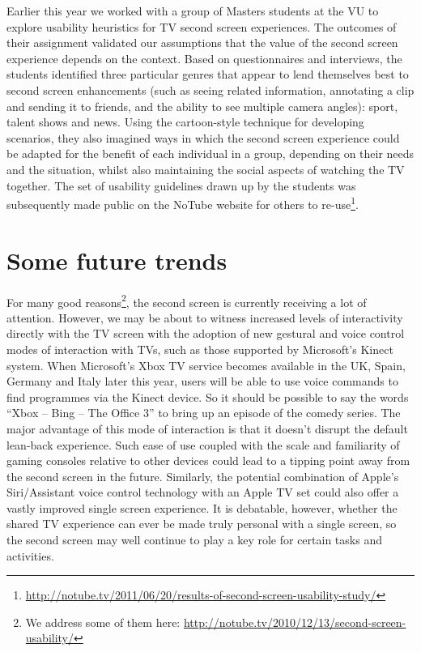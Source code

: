 \documentclass{notube}
\begin{document}
Earlier this year we worked with a group of Masters students at the VU to explore usability heuristics for TV second screen experiences. The outcomes of their assignment validated our assumptions that the value of the second screen experience depends on the context. Based on questionnaires and interviews, the students identified three particular genres that appear to lend themselves best to second screen enhancements (such as seeing related information, annotating a clip and sending it to friends, and the ability to see multiple camera angles): sport, talent shows and news. Using the cartoon-style technique for developing scenarios, they also imagined ways in which the second screen experience could be adapted for the benefit of each individual in a group, depending on their needs and the situation, whilst also maintaining the social aspects of watching the TV together. The set of usability guidelines drawn up by the students was subsequently made public on the NoTube website for others to re-use\footnote{\url{http://notube.tv/2011/06/20/results-of-second-screen-usability-study/}}.

\section{Some future trends}

For many good reasons\footnote{We address some of them here: \url{http://notube.tv/2010/12/13/second-screen-usability/}}, the second screen is currently receiving a lot of attention. However, we may be about to witness increased levels of interactivity directly with the TV screen with the adoption of new gestural and voice control modes of interaction with TVs, such as those supported by Microsoft’s Kinect system. When Microsoft’s Xbox TV service becomes available in the UK, Spain, Germany and Italy later this year, users will be able to use voice commands to find programmes via the Kinect device. So it should be possible to say the words ``Xbox – Bing – The Office 3” to bring up an episode of the comedy series. The major advantage of this mode of interaction is that it doesn’t disrupt the default lean-back experience. Such ease of use coupled with the scale and familiarity of gaming consoles relative to other devices could lead to a tipping point away from the second screen in the future. Similarly, the potential combination of Apple’s  Siri/Assistant voice control technology with an Apple TV set could also offer a vastly improved single screen experience. It is debatable, however, whether the shared TV experience can ever be made truly personal with a single screen, so the second screen may well continue to play a key role for certain tasks and activities.
\end{document}
